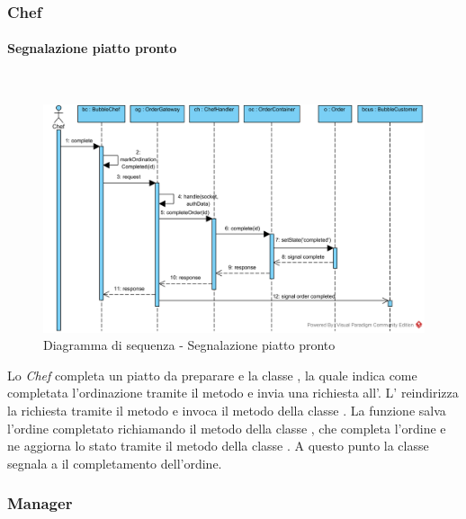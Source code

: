 \subsubsection{Chef}

\paragraph{Segnalazione piatto pronto}\mbox{} \\
\nopagebreak
\begin{figure}[H]
	\centering
	\includegraphics[width=15cm]{./diagrammi/sequenza/chef_piatto_pronto.png}
	\caption{Diagramma di sequenza - Segnalazione piatto pronto}
\end{figure}
Lo \textit{Chef} completa un piatto da preparare e la classe , la quale indica come completata l'ordinazione tramite il metodo  e invia una richiesta all'. L' reindirizza la richiesta tramite il metodo  e invoca il metodo  della classe . La funzione salva l'ordine completato richiamando il metodo  della classe , che completa l'ordine e ne aggiorna lo stato tramite il metodo  della classe . A questo punto la classe  segnala a  il completamento dell'ordine.

\subsubsection{Manager}

